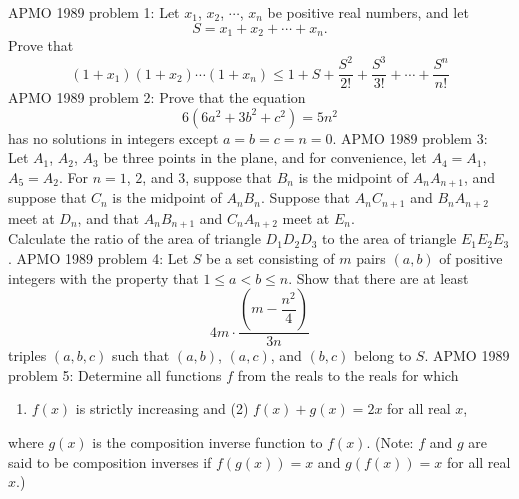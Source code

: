 APMO 1989 problem 1:  Let $x_1$, $x_2$, $\cdots$, $x_n$ be positive real numbers, and let
\[ S = x_1 + x_2 + \cdots + x_n. \]
Prove that
\[
(1 + x_1)(1 + x_2) \cdots (1 + x_n) \leq 1 + S + \frac{S^2}{2!} + \frac{S^3}{3!} + \cdots + \frac{S^n}{n!}
\] 
APMO 1989 problem 2:  Prove that the equation
\[ 6(6a^2 + 3b^2 + c^2) = 5n^2 \]
has no solutions in integers except $a = b = c = n = 0$. 
APMO 1989 problem 3:  Let $A_1$, $A_2$, $A_3$ be three points in the plane, and for convenience, let $A_4= A_1$, $A_5 = A_2$.  For $n = 1$, $2$, and $3$, suppose that $B_n$ is the midpoint of $A_n A_{n+1}$, and suppose that $C_n$ is the midpoint of $A_n B_n$. Suppose that $A_n C_{n+1}$ and $B_n A_{n+2}$ meet at $D_n$, and that $A_n B_{n+1}$ and $C_n A_{n+2}$ meet at $E_n$. \\
Calculate the ratio of the area of triangle $D_1 D_2 D_3$ to the area of triangle $E_1 E_2 E_3$. 
APMO 1989 problem 4:  Let $S$ be a set consisting of $m$ pairs $(a,b)$ of positive integers with the property that $1 \leq a < b \leq n$.  Show that there are at least
\[ 4m \cdot \dfrac{(m - \dfrac{n^2}{4})}{3n} \]
triples $(a,b,c)$ such that $(a,b)$, $(a,c)$, and $(b,c)$ belong to $S$. 
APMO 1989 problem 5:  Determine all functions $f$ from the reals to the reals for which
\begin{enumerate}[(1)]
  \item $f(x)$ is strictly increasing and (2) $f(x) + g(x) = 2x$ for all real $x$,
\end{enumerate}
where $g(x)$ is the composition inverse function to $f(x)$.  (Note: $f$ and $g$ are said to be composition inverses if $f(g(x)) = x$ and $g(f(x)) = x$ for all real $x$.) 
